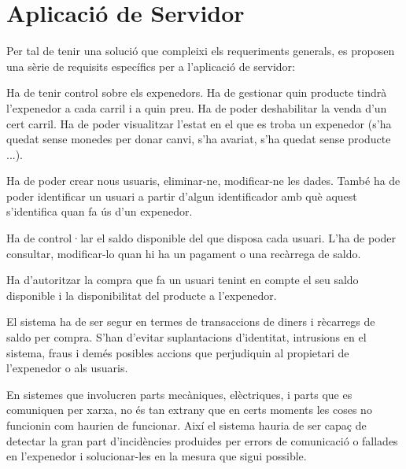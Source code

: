 \section{Aplicació de Servidor}
Per tal de tenir una solució que compleixi els requeriments generals, es proposen una sèrie de requisits específics per a l'aplicació de servidor:
\begin{description}[font=\normalfont\textbf]\itemsep2pt 
\vspace{-1em}
\parskip1pt 
\item[Gestió d'expenedors] Ha de tenir control sobre els expenedors. Ha de gestionar quin producte tindrà l'expenedor a cada carril i a quin preu. Ha de poder deshabilitar la venda d'un cert carril. Ha de poder visualitzar l'estat en el que es troba un expenedor (s'ha quedat sense monedes per donar canvi, s'ha avariat, s'ha quedat sense producte ...).
\item[Gestió d'usuaris] Ha de poder crear nous usuaris, eliminar-ne, modificar-ne les dades. També ha de poder identificar un usuari a partir d'algun identificador amb què aquest s'identifica quan fa ús d'un expenedor.
\item[Gestió del saldo disponible] Ha de control·lar el saldo disponible del que disposa cada usuari. L'ha de poder consultar, modificar-lo quan hi ha un pagament o una recàrrega de saldo. 
\item[Gestió de les compres] Ha d'autoritzar la compra que fa un usuari tenint en compte el seu saldo disponible i la disponibilitat del producte a l'expenedor.
\item[Seguretat en les transaccions] El sistema ha de ser segur en termes de transaccions de diners i rècarregs de saldo per compra. S'han d'evitar suplantacions d'identitat, intrusions en el sistema, fraus i demés posibles accions que perjudiquin al propietari de l'expenedor o als usuaris.
\item[Detecció i gestió d'incidencies] En sistemes que involucren parts mecàniques, elèctriques, i parts que es comuniquen per xarxa, no és tan extrany que en certs moments les coses no funcionin com haurien de funcionar. Així el sistema hauria de ser capaç de detectar la gran part d'incidències produides per errors de comunicació o fallades en l'expenedor i solucionar-les en la mesura que sigui possible.
\vspace{-1em}
\end{description}

